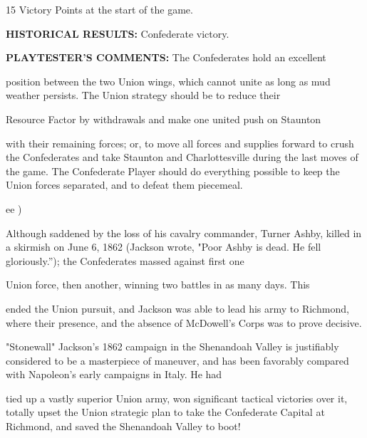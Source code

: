 15 Victory Points at the start of the game.

\begin{scenariodata}
\textbf{HISTORICAL RESULTS:} Confederate victory.\\
\end{scenariodata}

\begin{scenariodata}
\textbf{PLAYTESTER'S COMMENTS:} The Confederates hold an excellent\\
\end{scenariodata}

position between the two Union wings, which cannot unite as long as mud weather persists. The Union strategy should be to reduce their

\begin{scenariodata}
Resource Factor by withdrawals and make one united push on Staunton\\
\end{scenariodata}

with their remaining forces; or, to move all forces and supplies forward to crush the Confederates and take Staunton and Charlottesville during the last moves of the game. The Confederate Player should do everything possible to keep the Union forces separated, and to defeat them piecemeal.

ee )

Although saddened by the loss of his cavalry commander, Turner Ashby, killed in a skirmish on June 6, 1862 (Jackson wrote, "Poor Ashby is dead. He fell gloriously.''); the Confederates massed against first one

\begin{scenariodata}
Union force, then another, winning two battles in as many days. This\\
\end{scenariodata}

ended the Union pursuit, and Jackson was able to lead his army to Richmond, where their presence, and the absence of McDowell's Corps was to prove decisive.

"Stonewall" Jackson's 1862 campaign in the Shenandoah Valley is justifiably considered to be a masterpiece of maneuver, and has been favorably compared with Napoleon's early campaigns in Italy. He had

tied up a vastly superior Union army, won significant tactical victories over it, totally upset the Union strategic plan to take the Confederate Capital at Richmond, and saved the Shenandoah Valley to boot!

